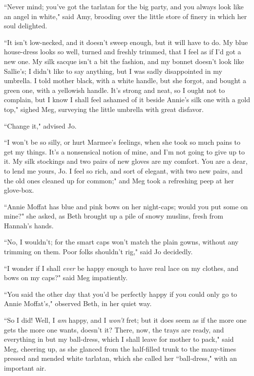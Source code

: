 ``Never mind; you've got the tarlatan for the big party,
and you always look like an angel in white," said Amy, brooding over the
little store of finery in which her soul delighted.

``It isn't low-necked, and it doesn't
sweep enough, but it will have to do. My blue house-dress looks so well,
turned and freshly trimmed, that I feel as if I'd got a
new one. My silk sacque isn't a bit the fashion, and my
bonnet doesn't look like Sallie's; I
didn't like to say anything, but I was sadly
disappointed in my umbrella. I told mother black, with a white handle,
but she forgot, and bought a green one, with a yellowish handle.
It's strong and neat, so I ought not to complain, but I
know I shall feel ashamed of it beside Annie's silk one
with a gold top," sighed Meg, surveying the little umbrella with great
disfavor.

``Change it," advised Jo.

``I won't be so silly, or hurt Marmee's
feelings, when she took so much pains to get my things.
It's a nonsensical notion of mine, and
I'm not going to give up to it. My silk stockings and
two pairs of new gloves are my comfort. You are a dear, to lend me
yours, Jo. I feel so rich, and sort of elegant, with two new pairs, and
the old ones cleaned up for common;" and Meg took a refreshing peep at
her glove-box.

``Annie Moffat has blue and pink bows on her night-caps; would you put
some on mine?" she asked, as Beth brought up a pile of snowy muslins,
fresh from Hannah's hands.

``No, I wouldn't; for the smart caps
won't match the plain gowns, without any trimming on
them. Poor folks shouldn't rig," said Jo decidedly.

``I wonder if I shall \emph{ever} be happy enough to have real lace on my
clothes, and bows on my caps?" said Meg impatiently.

``You said the other day that you'd be perfectly happy if
you could only go to Annie Moffat's," observed Beth, in
her quiet way.

``So I did! Well, I \emph{am} happy, and I \emph{won't}
fret; but it does seem as if the more one gets the more one wants,
doesn't it? There, now, the trays are ready, and
everything in but my ball-dress, which I shall leave for mother to
pack," said Meg, cheering up, as she glanced from the half-filled trunk
to the many-times pressed and mended white tarlatan, which she called
her ``ball-dress," with an important air.


